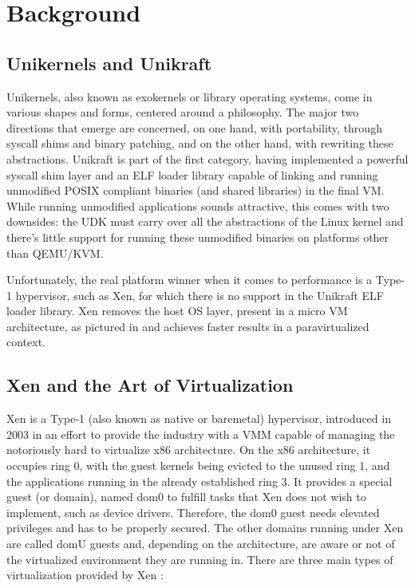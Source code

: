 \chapter{Background}
\label{chapter:background}

\section{Unikernels and Unikraft}
\label{sec:unikernels-unikraft}

Unikernels, also known as exokernels or library operating systems, come in various shapes and forms, centered around a philosophy.
The major two directions that emerge are concerned, on one hand, with portability, through syscall shims and binary patching, and on the other hand, with rewriting these abstractions.
Unikraft is part of the first category, having implemented a powerful syscall shim layer and an ELF loader library \cite{app-elfloader} capable of linking and running unmodified POSIX compliant binaries (and shared libraries) in the final VM.
While running unmodified applications sounds attractive, this comes with two downsides: the UDK must carry over all the abstractions of the Linux kernel and there's little support for running these unmodified binaries on platforms other than QEMU/KVM.

Unfortunately, the real platform winner when it comes to performance is a Type-1 hypervisor, such as Xen, for which there is no support in the Unikraft ELF loader library.
Xen removes the host OS layer, present in a micro VM architecture, as pictured in  and achieves faster results in a paravirtualized context.


\section{Xen and the Art of Virtualization \cite{art-of-xen}}
\label{sec:xen}

Xen is a Type-1 (also known as native or baremetal) hypervisor, introduced in 2003 in an effort to provide the industry with a VMM capable of managing the notoriously hard to virtualize x86 architecture.
On the x86 architecture, it occupies ring 0, with the guest kernels being evicted to the unused ring 1, and the applications running in the already established ring 3.
It provides a special guest (or domain), named dom0 to fulfill tasks that Xen does not wish to implement, such as device drivers.
Therefore, the dom0 guest needs elevated privileges and has to be properly secured.
The other domains running under Xen are called domU guests and, depending on the architecture, are aware or not of the virtualized environment they are running in.
There are three main types of virtualization provided by Xen \cite{xen-virtualization-types}:

